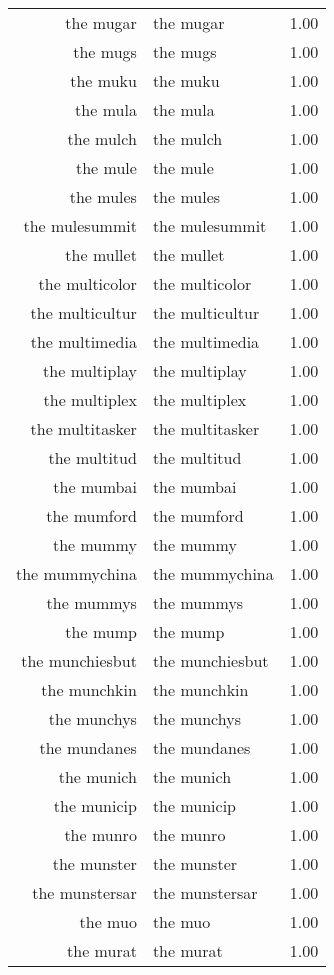 \begin{table}[ht]
\begin{tabular}{rlr}
  the mugar & the mugar & 1.00 \\ 
  the mugs & the mugs & 1.00 \\ 
  the muku & the muku & 1.00 \\ 
  the mula & the mula & 1.00 \\ 
  the mulch & the mulch & 1.00 \\ 
  the mule & the mule & 1.00 \\ 
  the mules & the mules & 1.00 \\ 
  the mulesummit & the mulesummit & 1.00 \\ 
  the mullet & the mullet & 1.00 \\ 
  the multicolor & the multicolor & 1.00 \\ 
  the multicultur & the multicultur & 1.00 \\ 
  the multimedia & the multimedia & 1.00 \\ 
  the multiplay & the multiplay & 1.00 \\ 
  the multiplex & the multiplex & 1.00 \\ 
  the multitasker & the multitasker & 1.00 \\ 
  the multitud & the multitud & 1.00 \\ 
  the mumbai & the mumbai & 1.00 \\ 
  the mumford & the mumford & 1.00 \\ 
  the mummy & the mummy & 1.00 \\ 
  the mummychina & the mummychina & 1.00 \\ 
  the mummys & the mummys & 1.00 \\ 
  the mump & the mump & 1.00 \\ 
  the munchiesbut & the munchiesbut & 1.00 \\ 
  the munchkin & the munchkin & 1.00 \\ 
  the munchys & the munchys & 1.00 \\ 
  the mundanes & the mundanes & 1.00 \\ 
  the munich & the munich & 1.00 \\ 
  the municip & the municip & 1.00 \\ 
  the munro & the munro & 1.00 \\ 
  the munster & the munster & 1.00 \\ 
  the munstersar & the munstersar & 1.00 \\ 
  the muo & the muo & 1.00 \\ 
  the murat & the murat & 1.00 \\ 

\end{tabular}
\end{table}

